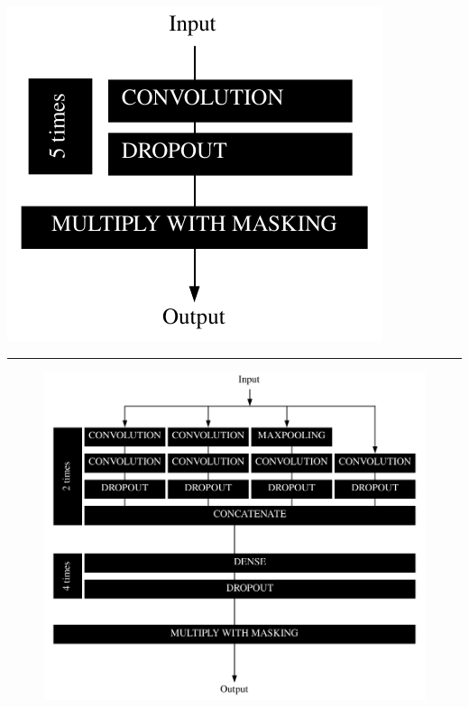 \documentclass[12pt, oneside, a4paper]{report}
\begin{document}
\begin{multicols}{2}
\begingroup
\centering
    \includegraphics[width=\columnwidth ]{figure/cnn.pdf}
        
    
    \hrule height 1pt
    

\endgroup

\begin{figure}[!tb]
    \centering
    \includegraphics[width=\textwidth]{figure/inception.pdf}
        

\end{figure}
\end{multicols}
\end{document}
